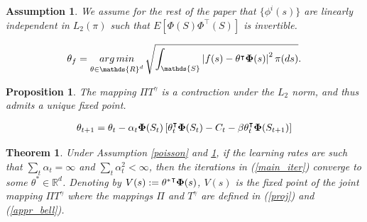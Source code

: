 \documentclass[10pt,a4paper]{amsart}
\newtheorem{assumption}{Assumption}
\newtheorem{prop}{Proposition}
\newtheorem{theorem}{Theorem}
\def\argmin{\mathop{\rm arg\, min}}
\begin{document}
\begin{assumption}\label{lin_ind}
We assume  for the rest of the paper that $\{\phi^i(s)\}$ are linearly independent in $L_2(\pi)$ such that $E\left[\Phi(S)\Phi^\intercal(S)\right]$ is invertible. 
\end{assumption}

\begin{align}\label{proj}
\theta_f =\argmin_{\theta\in\mathds{R}^d} \sqrt{\int_{\mathds{S}} \left| f(s) - \theta^\intercal {\bf \Phi}(s)\right|^2 \pi(ds)}.
\end{align}

\begin{prop}\label{comp_contr}
The mapping $\Pi T^\gamma$ is a contraction under the $L_2$ norm, and thus admits a unique fixed point.
\end{prop}

\begin{align}\label{main_iter}
\theta_{t+1}= \theta_t - \alpha_t {\bf \Phi}(S_t) \left[\theta_t^\intercal {\bf \Phi}(S_t) - C_t - \beta \theta^\intercal_t{\bf \Phi}(S_{t+1}) \right]
\end{align}

\begin{theorem}\label{main_thm}
Under Assumption \ref{poisson} and \ref{lin_ind}, if the learning rates are such that $\sum_t\alpha_t = \infty$ and $\sum_t \alpha_t^2<\infty$, then the iterations in (\ref{main_iter}) converge to some $\theta^* \in\mathds{R}^d$. Denoting by $V(s):={\theta^*}^\intercal {\bf \Phi}(s)$, $V(s)$ is the fixed point of the joint mapping $\Pi T^\gamma $ where the mappings $\Pi$ and $T^\gamma$ are defined in (\ref{proj}) and (\ref{appr_bell}).
\end{theorem}
\end{document}
